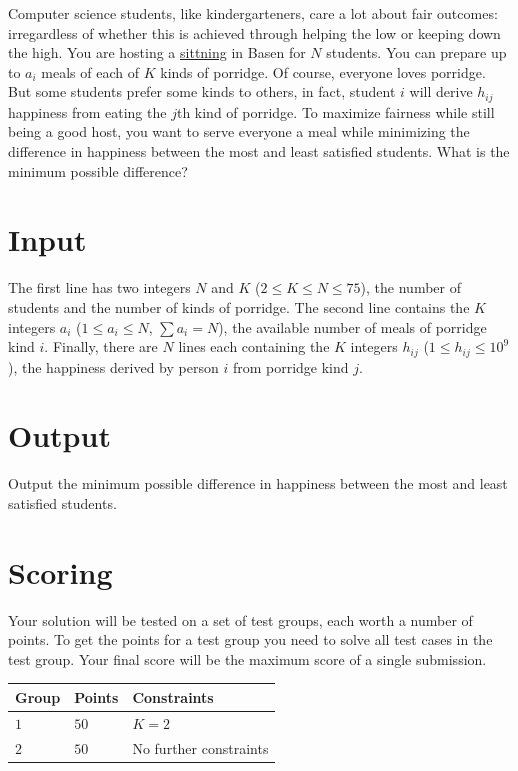 
Computer science students, like kindergarteners, care a lot about fair outcomes: irregardless of
whether this is achieved through helping the low or keeping down the high. You are hosting a
\href{https://en.wikipedia.org/wiki/Sittning}{sittning} in Basen for $N$ students. You can prepare
up to $a_i$ meals of each of $K$ kinds of porridge. Of course, everyone loves porridge. But some
students prefer some kinds to others, in fact, student $i$ will derive $h_{ij}$ happiness from
eating the $j$th kind of porridge. To maximize fairness while still being a good host, you want to serve everyone
a meal while minimizing the difference in happiness between the most and least satisfied students.
What is the minimum possible difference?


\section*{Input}

The first line has two integers $N$ and $K$ ($2 \le K \le N \le 75$), the number of students and the
number of kinds of porridge. The second line contains the $K$ integers $a_i$ ($1\le a_i\le N$, $\sum a_i = N$), the
available number of meals of porridge kind $i$. Finally, there are $N$ lines each containing the $K$
integers $h_{ij}$ ($1\le h_{ij}\le 10^9$), the happiness derived by person $i$ from porridge kind
$j$.

\section*{Output}

Output the minimum possible difference in happiness between the most and least satisfied students.

\section*{Scoring}

Your solution will be tested on a set of test groups, each worth a number of points. To get the
points for a test group you need to solve all test cases in the test group. Your final score will be
the maximum score of a single submission.

\noindent
\begin{tabular}{| l | l | l |}
  \hline
  Group & Points & Constraints \\ \hline
  $1$   & $50$       & $K = 2$ \\ \hline
  $2$   & $50$       & No further constraints \\ \hline
\end{tabular}
